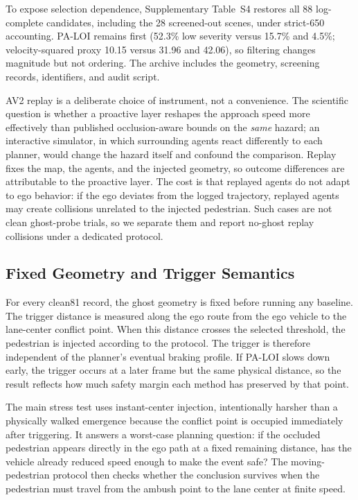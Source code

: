 \documentclass[journal]{IEEEtran}
\begin{document}
To expose selection dependence, Supplementary Table~S4 restores all 88 log-complete candidates, including the 28 screened-out scenes, under strict-650 accounting. PA-LOI remains first (52.3\% low severity versus 15.7\% and 4.5\%; velocity-squared proxy 10.15 versus 31.96 and 42.06), so filtering changes magnitude but not ordering. The archive includes the geometry, screening records, identifiers, and audit script.

AV2 replay is a deliberate choice of instrument, not a convenience. The scientific question is whether a proactive layer reshapes the approach speed more effectively than published occlusion-aware bounds on the \emph{same} hazard; an interactive simulator, in which surrounding agents react differently to each planner, would change the hazard itself and confound the comparison. Replay fixes the map, the agents, and the injected geometry, so outcome differences are attributable to the proactive layer. The cost is that replayed agents do not adapt to ego behavior: if the ego deviates from the logged trajectory, replayed agents may create collisions unrelated to the injected pedestrian. Such cases are not clean ghost-probe trials, so we separate them and report no-ghost replay collisions under a dedicated protocol.

\subsection{Fixed Geometry and Trigger Semantics}

For every clean81 record, the ghost geometry is fixed before running any baseline. The trigger distance is measured along the ego route from the ego vehicle to the lane-center conflict point. When this distance crosses the selected threshold, the pedestrian is injected according to the protocol. The trigger is therefore independent of the planner's eventual braking profile. If PA-LOI slows down early, the trigger occurs at a later frame but the same physical distance, so the result reflects how much safety margin each method has preserved by that point.

The main stress test uses instant-center injection, intentionally harsher than a physically walked emergence because the conflict point is occupied immediately after triggering. It answers a worst-case planning question: if the occluded pedestrian appears directly in the ego path at a fixed remaining distance, has the vehicle already reduced speed enough to make the event safe? The moving-pedestrian protocol then checks whether the conclusion survives when the pedestrian must travel from the ambush point to the lane center at finite speed.
\end{document}
